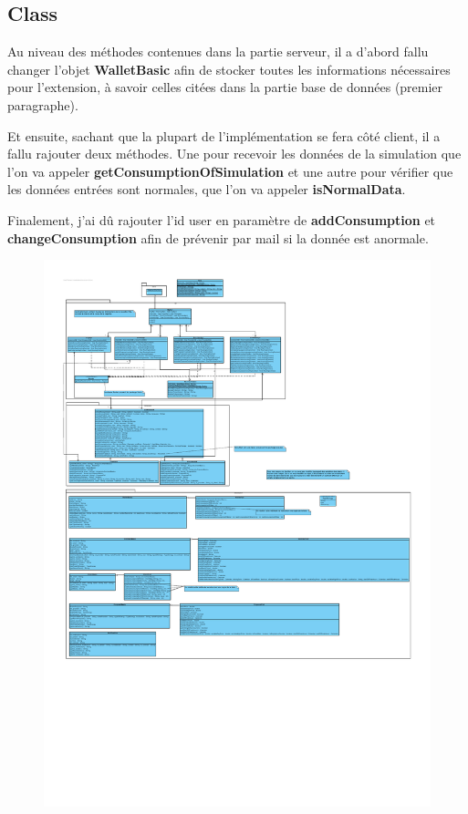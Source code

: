 \subsection{Class}

\begin{flushleft}
Au niveau des méthodes contenues dans la partie serveur, il a d'abord fallu changer l'objet \textbf{WalletBasic} afin de stocker toutes les informations nécessaires pour l'extension, à savoir celles citées dans la partie base de données (premier paragraphe).
\end{flushleft}

\begin{flushleft}
Et ensuite, sachant que la plupart de l'implémentation se fera côté client, il a fallu rajouter deux méthodes. Une pour recevoir les données de la simulation que l'on va appeler \textbf{getConsumptionOfSimulation} et une autre pour vérifier que les données entrées sont normales, que l'on va appeler \textbf{isNormalData}.
\end{flushleft}

\begin{flushleft}
Finalement, j'ai dû rajouter l'id user en paramètre de \textbf{addConsumption} et \textbf{changeConsumption} afin de prévenir par mail si la donnée est anormale.
\end{flushleft}

\begin{figure}[h]
\centering
\includegraphics[width=1.3\textwidth]{extension-adrien/ClassDiagram/img/classDiagram.pdf}
\end{figure}
